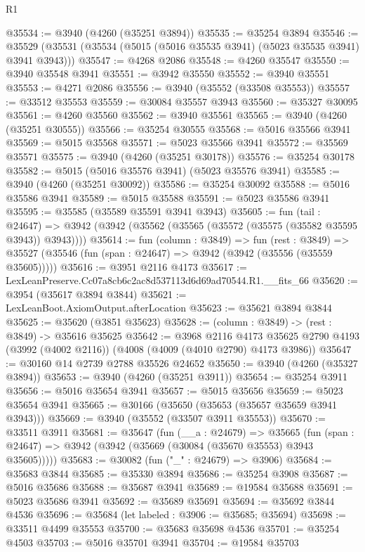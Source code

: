 \begin{lexlean}{R1}
\begin{coremodule}
@35534 := @3940 (@4260 (@35251 @3894))
@35535 := @35254 @3894
@35546 := @35529 (@35531 (@35534 (@5015 (@5016 @35535 @3941) (@5023 @35535 @3941) @3941 @3943)))
@35547 := @4268 @2086
@35548 := @4260 @35547
@35550 := @3940 @35548 @3941
@35551 := @3942 @35550
@35552 := @3940 @35551
@35553 := @4271 @2086
@35556 := @3940 (@35552 (@33508 @35553))
@35557 := @33512 @35553
@35559 := @30084 @35557 @3943
@35560 := @35327 @30095
@35561 := @4260 @35560
@35562 := @3940 @35561
@35565 := @3940 (@4260 (@35251 @30555))
@35566 := @35254 @30555
@35568 := @5016 @35566 @3941
@35569 := @5015 @35568
@35571 := @5023 @35566 @3941
@35572 := @35569 @35571
@35575 := @3940 (@4260 (@35251 @30178))
@35576 := @35254 @30178
@35582 := @5015 (@5016 @35576 @3941) (@5023 @35576 @3941)
@35585 := @3940 (@4260 (@35251 @30092))
@35586 := @35254 @30092
@35588 := @5016 @35586 @3941
@35589 := @5015 @35588
@35591 := @5023 @35586 @3941
@35595 := @35585 (@35589 @35591 @3941 @3943)
@35605 := fun (tail : @24647) =>
  @3942 (@3942 (@35562 (@35565 (@35572 (@35575 (@35582 @35595 @3943)) @3943))))
@35614 := fun (column : @3849) =>
  fun (rest : @3849) =>
  @35527 (@35546 (fun (span : @24647) => @3942 (@3942 (@35556 (@35559 @35605)))))
@35616 := @3951 @2116 @4173
@35617 := LexLeanPreserve.Cc07a8cb6c2ac8d537113d6d69ad70544.R1.__fits_66
@35620 := @3954 (@35617 @3894 @3844)
@35621 := LexLeanBoot.AxiomOutput.afterLocation
@35623 := @35621 @3894 @3844
@35625 := @35620 (@3851 @35623)
@35628 := (column : @3849) -> (rest : @3849) -> @35616 @35625
@35642 := @3968
    @2116
    @4173
    @35625
    @2790
    @4193
    (@3992 (@4002 @2116))
    (@4008 (@4009 (@4010 @2790) @4173 @3986))
@35647 := @30160 @14 @2739 @2788 @35526 @24652
@35650 := @3940 (@4260 (@35327 @3894))
@35653 := @3940 (@4260 (@35251 @3911))
@35654 := @35254 @3911
@35656 := @5016 @35654 @3941
@35657 := @5015 @35656
@35659 := @5023 @35654 @3941
@35665 := @30166 (@35650 (@35653 (@35657 @35659 @3941 @3943)))
@35669 := @3940 (@35552 (@33507 @3911 @35553))
@35670 := @33511 @3911
@35681 := @35647
    (fun (__a : @24679) =>
    @35665 (fun (span : @24647) => @3942 (@3942 (@35669 (@30084 (@35670 @35553) @3943 @35605)))))
@35683 := @30082 (fun ("_" : @24679) => @3906)
@35684 := @35683 @3844
@35685 := @35330 @3894
@35686 := @35254 @3908
@35687 := @5016 @35686
@35688 := @35687 @3941
@35689 := @19584 @35688
@35691 := @5023 @35686 @3941
@35692 := @35689 @35691
@35694 := @35692 @3844 @4536
@35696 := @35684 (let labeled : @3906 := @35685; @35694)
@35698 := @33511 @4499 @35553
@35700 := @35683 @35698 @4536
@35701 := @35254 @4503
@35703 := @5016 @35701 @3941
@35704 := @19584 @35703

\end{coremodule}
\end{lexlean}
